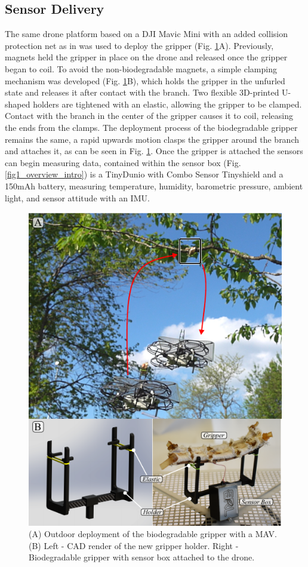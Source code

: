 \subsection{Sensor Delivery}
The same drone platform based on a DJI Mavic Mini with an added collision protection net as in \cite{Geckeler2022a} was used to deploy the gripper (Fig. \ref{fig7_outdoor}A). Previously, magnets held the gripper in place on the drone and released once the gripper began to coil. To avoid the non-biodegradable magnets, a simple clamping mechanism was developed (Fig. \ref{fig7_outdoor}B), which holds the gripper in the unfurled state and releases it after contact with the branch. Two flexible 3D-printed U-shaped holders are tightened with an elastic, allowing the gripper to be clamped. Contact with the branch in the center of the gripper causes it to coil, releasing the ends from the clamps. The deployment process of the biodegradable gripper remains the same, a rapid upwards motion clasps the gripper around the branch and attaches it, as can be seen in Fig. \ref{fig7_outdoor}. Once the gripper is attached the sensors can begin measuring data, contained within the sensor box (Fig. \ref{fig1_overview_intro}) is a TinyDunio with Combo Sensor Tinyshield and a 150mAh battery, measuring temperature, humidity, barometric pressure, ambient light, and sensor attitude with an IMU.
\begin{figure}[!t]
\centering
\includegraphics[width=1\columnwidth]{figures/figure7-outdoor/figure7-outdoor.pdf}
\caption{(A) Outdoor deployment of the biodegradable gripper with a MAV. (B) Left - CAD render of the new gripper holder. Right - Biodegradable gripper with sensor box attached to the drone.}
\label{fig7_outdoor}
\end{figure}

